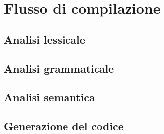 
\chapter{Flusso di compilazione}
\label{chap:flusso-di-compilazione}

\section{Analisi lessicale}
\label{sec:analisi-lessicale}

\section{Analisi grammaticale}
\label{sec:analisi-grammaticale}

\section{Analisi semantica}
\label{sec:analisi-semantica}

\section{Generazione del codice}
\label{sec:generazione-del-codice}

